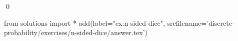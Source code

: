
\begin{ex} 
  \label{ex:n-sided-dice}
  
  \qed
\end{ex} 
\begin{python0}
from solutions import *
add(label="ex:n-sided-dice",
    srcfilename='discrete-probability/exercises/n-sided-dice/answer.tex') 
\end{python0}
